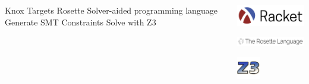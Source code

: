 \begin{frame}{}
\begin{columns}
  \centering
  \begin{outline}
  \1 Knox 
  \1 Targets Rosette \cite{Torlak2013Growing}
  \2 Solver-aided programming language
  \1 Generate SMT Constraints
  \2 Solve with Z3 \cite{De2008Z3}
  \end{outline}

  \centering
  \begin{center}
  \includegraphics[width=3cm]{racket_logo.png}

  \includegraphics[width=5cm]{rosette_logo.png}

  \includegraphics[width=1cm]{z3_logo.jpg}

  \end{center}
\end{columns}
\end{frame}
